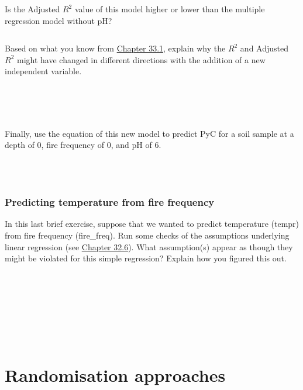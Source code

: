 \documentclass[
]{scrbook}
\begin{document}
\begin{verbatim}
\end{verbatim}

Is the Adjusted \(R^{2}\) value of this model higher or lower than the multiple regression model without pH?

\begin{verbatim}
\end{verbatim}

Based on what you know from \protect\hyperlink{adjusted-coefficient-of-determination}{Chapter 33.1}, explain why the \(R^{2}\) and Adjusted \(R^{2}\) might have changed in different directions with the addition of a new independent variable.

\begin{verbatim}




\end{verbatim}

Finally, use the equation of this new model to predict PyC for a soil sample at a depth of 0, fire frequency of 0, and pH of 6.

\begin{verbatim}



\end{verbatim}

\hypertarget{predicting-temperature-from-fire-frequency}{%
\section{Predicting temperature from fire frequency}\label{predicting-temperature-from-fire-frequency}}

In this last brief exercise, suppose that we wanted to predict temperature (tempr) from fire frequency (fire\_freq).
Run some checks of the assumptions underlying linear regression (see \protect\hyperlink{regression-assumptions}{Chapter 32.6}).
What assumption(s) appear as though they might be violated for this simple regression?
Explain how you figured this out.

\begin{verbatim}







\end{verbatim}

\hypertarget{part-randomisation-approaches}{%
\part{Randomisation approaches}\label{part-randomisation-approaches}}
\end{document}
